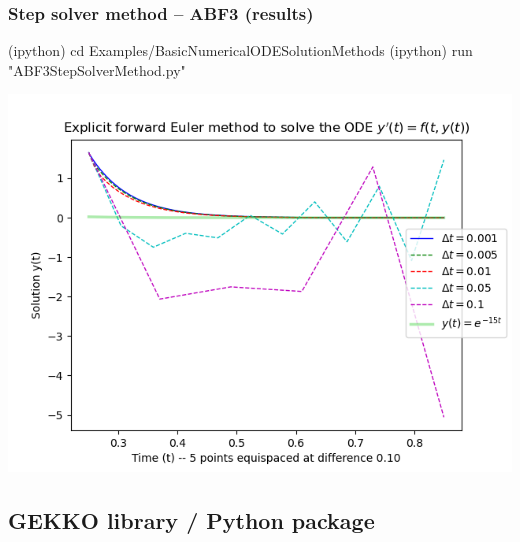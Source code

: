 \documentclass[usenames,svgnames,dvipsnames,10pt]{beamer}
\begin{document}
\begin{frame}[fragile]
\frametitle{Step solver method -- ABF3 (results)}

\begin{center}
\begin{code}
(ipython) cd Examples/BasicNumericalODESolutionMethods
(ipython) run "ABF3StepSolverMethod.py"
\end{code}
\vskip -0.205cm
\includegraphics[height=0.76\textheight]{../Images/ABF3MultistepMethodResults-StepSizeHComparison-v2.png}
\end{center}

\end{frame}

\subsection{GEKKO library / Python package} 
\end{document}
